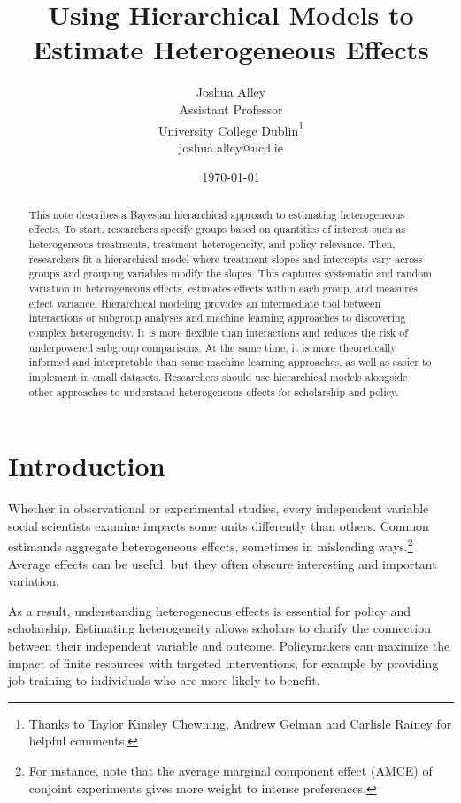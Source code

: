 \documentclass[12pt]{article}
\title{\textbf{Using Hierarchical Models to Estimate Heterogeneous Effects}}
\author{Joshua Alley \\
Assistant Professor \\
University College Dublin\thanks{Thanks to Taylor Kinsley Chewning, Andrew Gelman and Carlisle Rainey for helpful comments.} \\
joshua.alley@ucd.ie
}
\date{\today}
\begin{document}
\maketitle 

\begin{abstract} 
This note describes a Bayesian hierarchical approach to estimating heterogeneous effects. 
To start, researchers specify groups based on quantities of interest such as heterogeneous treatments, treatment heterogeneity, and policy relevance.  
Then, researchers fit a hierarchical model where treatment slopes and intercepts vary across groups and grouping variables modify the slopes.
This captures systematic and random variation in heterogeneous effects, estimates effects within each group, and measures effect variance. 
Hierarchical modeling provides an intermediate tool between interactions or subgroup analyses and machine learning approaches to discovering complex heterogeneity. 
It is more flexible than interactions and reduces the risk of underpowered subgroup comparisons.
At the same time, it is more theoretically informed and interpretable than some machine learning approaches, as well as easier to implement in small datasets. 
Researchers should use hierarchical models alongside other approaches to understand heterogeneous effects for scholarship and policy.
\end{abstract} 


\newpage 
\doublespace 


\section{Introduction}


Whether in observational or experimental studies, every independent variable social scientists examine impacts some units differently than others. 
Common estimands aggregate heterogeneous effects, sometimes in misleading ways.\footnote{For instance, \citet{Abramsonetal2022} note that the average marginal component effect (AMCE) of conjoint experiments gives more weight to intense preferences.} 
Average effects can be useful, but they often obscure interesting and important variation. 


As a result, understanding heterogeneous effects is essential for policy and scholarship. 
Estimating heterogeneity allows scholars to clarify the connection between their independent variable and outcome.
Policymakers can maximize the impact of finite resources with targeted interventions, for example by providing job training to individuals who are more likely to benefit. 
\end{document}
